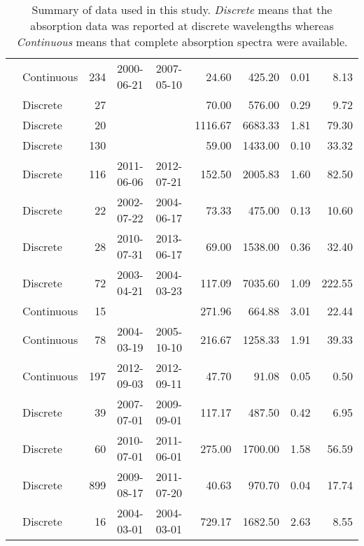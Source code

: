 \begin{table}[ht]
\begin{tabular}{llrllrrrr}
  \citet{Osburn2007} & Continuous & 234 & 2000-06-21 & 2007-05-10 & 24.60 & 425.20 & 0.01 & 8.13 \\ 
  \citet{Osburn2009} & Discrete &  27 &  &  & 70.00 & 576.00 & 0.29 & 9.72 \\ 
  \citet{Osburn2011} & Discrete &  20 &  &  & 1116.67 & 6683.33 & 1.81 & 79.30 \\ 
  \citet{Osburn2016} & Discrete & 130 &  &  & 59.00 & 1433.00 & 0.10 & 33.32 \\ 
  \citet{Polaris2012} & Discrete & 116 & 2011-06-06 & 2012-07-21 & 152.50 & 2005.83 & 1.60 & 82.50 \\ 
  \citet{Retamal2007} & Discrete &  22 & 2002-07-22 & 2004-06-17 & 73.33 & 475.00 & 0.13 & 10.60 \\ 
  \citet{Shen2014} & Discrete &  28 & 2010-07-31 & 2013-06-17 & 69.00 & 1538.00 & 0.36 & 32.40 \\ 
  \citet{Sickman2010} & Discrete &  72 & 2003-04-21 & 2004-03-23 & 117.09 & 7035.60 & 1.09 & 222.55 \\ 
  \citet{Stedmon2007a} & Continuous &  15 &  &  & 271.96 & 664.88 & 3.01 & 22.44 \\ 
  \citet{Stedmon2011} & Continuous &  78 & 2004-03-19 & 2005-10-10 & 216.67 & 1258.33 & 1.91 & 39.33 \\ 
  \citet{Stedmon2015} & Continuous & 197 & 2012-09-03 & 2012-09-11 & 47.70 & 91.08 & 0.05 & 0.50 \\ 
  \citet{Tehrani2013} & Discrete &  39 & 2007-07-01 & 2009-09-01 & 117.17 & 487.50 & 0.42 & 6.95 \\ 
  \citet{Wagner2015} & Discrete &  60 & 2010-07-01 & 2011-06-01 & 275.00 & 1700.00 & 1.58 & 56.59 \\ 
  \citet{Werdell2003} & Discrete & 899 & 2009-08-17 & 2011-07-20 & 40.63 & 970.70 & 0.04 & 17.74 \\ 
  \citet{Zhang2005} & Discrete &  16 & 2004-03-01 & 2004-03-01 & 729.17 & 1682.50 & 2.63 & 8.55 \\ 
   \hline
\end{tabular}
\endgroup
\caption{Summary of data used in this study. \textit{Discrete} means that the 
absorption data was reported at discrete wavelengths whereas 
\textit{Continuous} means that complete absorption spectra were available.} 
\end{table}
